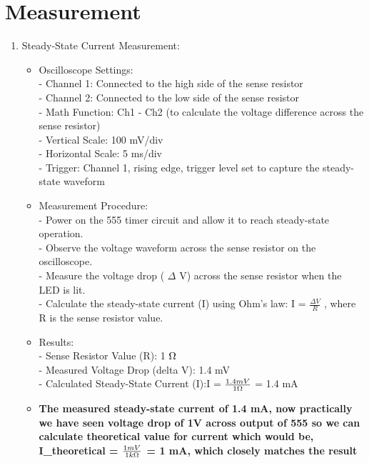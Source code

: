 \documentclass[a4paper,11pt]{article}%
\begin{document}
\section{Measurement}
\begin{enumerate}
	\item Steady-State Current Measurement:
	      \begin{itemize}
		      \item Oscilloscope Settings: \\
		            - Channel 1: Connected to the high side of the sense resistor \\
		            - Channel 2: Connected to the low side of the sense resistor \\
		            - Math Function: Ch1 - Ch2 (to calculate the voltage difference across the sense resistor) \\
		            - Vertical Scale: 100 mV/div \\
		            - Horizontal Scale: 5 ms/div \\
		            - Trigger: Channel 1, rising edge, trigger level set to capture the steady-state waveform \\
		      \item Measurement Procedure: \\
		            - Power on the 555 timer circuit and allow it to reach steady-state operation. \\
		            - Observe the voltage waveform across the sense resistor on the oscilloscope. \\
		            - Measure the voltage drop ( $\Delta$ V) across the sense resistor when the LED is lit. \\
		            - Calculate the steady-state current (I) using Ohm's law: I = $\frac{\Delta V}{R}$ , where R is the sense resistor value.
		      \item Results: \\
		            - Sense Resistor Value (R): 1 $\ohm$ \\
		            - Measured Voltage Drop (delta V): 1.4 mV \\
		            - Calculated Steady-State Current (I):I = $\frac{1.4mV}{1 \ohm}$ = 1.4 mA
		      \item \textbf{The measured steady-state current of 1.4 mA, now practically we have seen voltage drop of 1V across output of 555 so we can calculate theoretical value for current which would be,\\
			            I\_theoretical = $\frac{1mV}{1 k\ohm}$ = 1 mA, which closely matches the result}


\end{itemize}
\end{enumerate}
\end{document}
